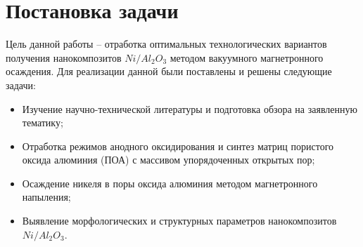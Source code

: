 \section{Постановка задачи}

Цель данной работы – отработка оптимальных технологических вариантов получения нанокомпозитов $Ni/Al_2O_3$  методом вакуумного магнетронного осаждения. 
Для реализации данной были поставлены и решены следующие задачи:
\begin{itemize}
    \item Изучение научно-технической литературы и подготовка обзора на заявленную тематику;
    \item Отработка режимов анодного оксидирования и синтез матриц пористого оксида алюминия (ПОА) с массивом упорядоченных открытых пор;
    \item Осаждение никеля в поры оксида алюминия методом магнетронного напыления;
    \item Выявление морфологических и структурных параметров нанокомпозитов $Ni/Al_2O_3$.
\end{itemize}

\clearpage
